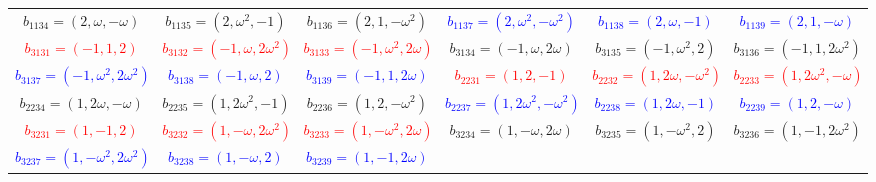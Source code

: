 \documentclass[%
  reprint,
  superscriptaddress,
  showkeys,
  amsmath,amssymb,
  aps,pra,
  longbibliography,
  floatfix,
  x11names
]{revtex4-2}
\begin{document}
\begin{table}[htbp!]
\begin{ruledtabular}
\begin{tabular}{*{6}{c}}
\textcolor{green!40!black}{$b_{1134}=(2,\omega,-\omega)$} & \textcolor{green!40!black}{$b_{1135}=(2,\omega^2,-1)$} & \textcolor{green!40!black}{$b_{1136}=(2,1,-\omega^2)$} & \textcolor{blue}{$b_{1137}=(2,\omega^2,-\omega^2)$} & \textcolor{blue}{$b_{1138}=(2,\omega,-1)$} & \textcolor{blue}{$b_{1139}=(2,1,-\omega)$} \\
\textcolor{red}{$b_{3131}=(-1,1,2)$} & \textcolor{red}{$b_{3132}=(-1,\omega,2\omega^2)$} & \textcolor{red}{$b_{3133}=(-1,\omega^2,2\omega)$} & \textcolor{green!40!black}{$b_{3134}=(-1,\omega,2\omega)$} & \textcolor{green!40!black}{$b_{3135}=(-1,\omega^2,2)$} & \textcolor{green!40!black}{$b_{3136}=(-1,1,2\omega^2)$} \\
\textcolor{blue}{$b_{3137}=(-1,\omega^2,2\omega^2)$} & \textcolor{blue}{$b_{3138}=(-1,\omega,2)$} & \textcolor{blue}{$b_{3139}=(-1,1,2\omega)$} & \textcolor{red}{$b_{2231}=(1,2,-1)$} & \textcolor{red}{$b_{2232}=(1,2\omega,-\omega^2)$} & \textcolor{red}{$b_{2233}=(1,2\omega^2,-\omega)$} \\
\textcolor{green!40!black}{$b_{2234}=(1,2\omega,-\omega)$} & \textcolor{green!40!black}{$b_{2235}=(1,2\omega^2,-1)$} & \textcolor{green!40!black}{$b_{2236}=(1,2,-\omega^2)$} & \textcolor{blue}{$b_{2237}=(1,2\omega^2,-\omega^2)$} & \textcolor{blue}{$b_{2238}=(1,2\omega,-1)$} & \textcolor{blue}{$b_{2239}=(1,2,-\omega)$} \\
\textcolor{red}{$b_{3231}=(1,-1,2)$} & \textcolor{red}{$b_{3232}=(1,-\omega,2\omega^2)$} & \textcolor{red}{$b_{3233}=(1,-\omega^2,2\omega)$} & \textcolor{green!40!black}{$b_{3234}=(1,-\omega,2\omega)$} & \textcolor{green!40!black}{$b_{3235}=(1,-\omega^2,2)$} & \textcolor{green!40!black}{$b_{3236}=(1,-1,2\omega^2)$} \\
\textcolor{blue}{$b_{3237}=(1,-\omega^2,2\omega^2)$} & \textcolor{blue}{$b_{3238}=(1,-\omega,2)$} & \textcolor{blue}{$b_{3239}=(1,-1,2\omega)$} & & & \\
\end{tabular}
\end{ruledtabular}
\end{table}
\end{document}

